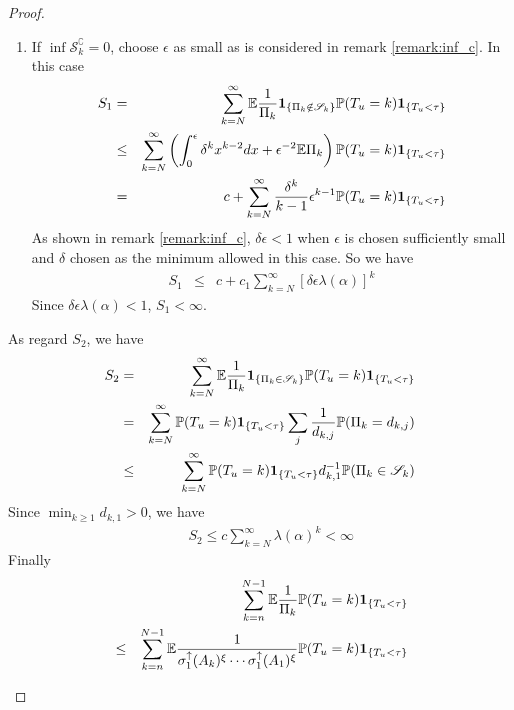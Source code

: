 \documentclass{article}
\begin{document}
\begin{proof}
\begin{enumerate}
\begin{enumerate}
      \item If $\inf \mathscr S_k^\complement = 0$, choose $\epsilon$
        as small as is considered in remark \ref{remark:inf_c}. In
        this case
        \begin{eqnarray*}
          S_1 &=& \sum_{k=N}^{\infty} \mathbb{E} {1 \over \Pi_k}\mathbf{1}_{\{\Pi_k \notin
            \mathscr S_k\}} \mathbb{P}(T_u = k) \mathbf{1}_{\{T_u < \tau\}} \\
          &\leq& \sum_{k=N}^{\infty} \left(
            \int_{0}^\epsilon \delta^k x^{k-2} dx
            + \epsilon^{-2} \mathbb{E}\Pi_k
          \right) \mathbb{P}(T_u = k) \mathbf{1}_{\{T_u < \tau\}} \\
          &=& c + \sum_{k=N}^\infty
          {\delta^{k} \over k-1} \epsilon^{k-1} \mathbb{P}(T_u = k) \mathbf{1}_{\{T_u < \tau\}}
        \end{eqnarray*}
        As shown in remark \ref{remark:inf_c}, $\delta \epsilon < 1$
        when $\epsilon$ is chosen sufficiently small and $\delta$ chosen
        as the minimum allowed in this case. So we have
        \begin{eqnarray*}
          S_1 &\leq& c + c_1 \sum_{k=N}^\infty [\delta \epsilon
          \lambda(\alpha)]^k
        \end{eqnarray*}
        Since $\delta \epsilon \lambda(\alpha) < 1$, $S_1 < \infty$.
      \end{enumerate}
      As regard $S_2$, we have
      \begin{eqnarray*}
        S_2 &=& \sum_{k=N}^{\infty}
        \mathbb{E} {1 \over \Pi_k}\mathbf{1}_{\{\Pi_k \in \mathscr S_k\}}
        \mathbb{P}(T_u = k) \mathbf{1}_{\{T_u < \tau\}} \\
        &=& \sum_{k=N}^\infty \mathbb{P}(T_u = k)\mathbf{1}_{\{T_u < \tau\}}
        \sum_{j} {1 \over d_{k,j}} \mathbb{P}(\Pi_k = d_{k,j}) \\
        &\leq& \sum_{k=N}^\infty \mathbb{P}(T_u = k)\mathbf{1}_{\{T_u < \tau\}} d_{k,1}^{-1}
        \mathbb{P} (\Pi_k \in \mathscr S_k)
      \end{eqnarray*}
      Since $\min_{k \geq 1} d_{k,1} > 0$, we have
      \begin{eqnarray*}
        && S_2 \leq c \sum_{k=N}^\infty \lambda(\alpha)^k < \infty
      \end{eqnarray*}
      Finally
    \begin{eqnarray*}
      && \sum_{k=n}^{N-1}
      \E {1 \over \Pi_k} \P(T_u = k) \1{T_u < \tau}\\ 
      &\leq& \sum_{k=n}^{N-1} \E {
        1 \over
        \sigma^{\uparrow}_1(A_k)^\xi \cdots \sigma^{\uparrow}_1(A_1)^\xi
      } \P(T_u = k) \1{T_u < \tau} \\

\end{eqnarray*}
\end{enumerate}
\end{proof}
\end{document}
